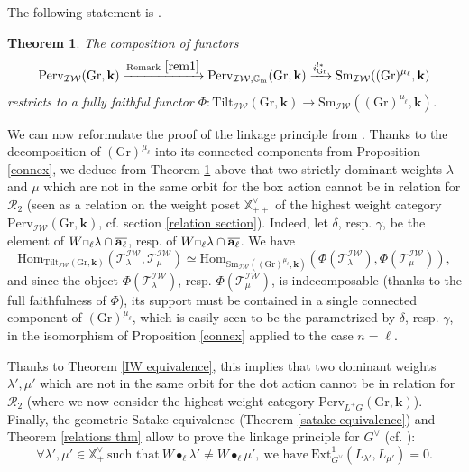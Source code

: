 \documentclass[11pt]{amsart}
\theoremstyle{plain}
\newtheorem{thm}{Theorem}[section]
\theoremstyle{remark}
\newcommand{\car}{\mbox{\relsize{-5}$\Box$}}
\numberwithin{equation}{section}
\begin{document}
	The following statement is \cite[Theorem 7.4]{riche2020smithtreumann}.
	\begin{thm}\label{equivalence1}
		The composition of functors
		$$\mathrm{Perv}_{\mathcal{IW}}(\mathrm{Gr},\mathbf{k})\xrightarrow{\text{Remark}~ \ref{rem1}}\mathrm{Perv}_{\mathcal{IW},\mathbb{G}_\mathrm{m}}(\mathrm{Gr},\mathbf{k})\xrightarrow{i^{!*}_{\mathrm{Gr}}}\mathrm{Sm}_{\mathcal{IW}}((\mathrm{Gr})^{\mu_\ell},\mathbf{k})$$
		restricts to a fully faithful functor $\Phi:\mathrm{Tilt}_{\mathcal{IW}}(\mathrm{Gr},\mathbf{k})\to \mathrm{Sm}_{\mathcal{IW}}((\mathrm{Gr})^{\mu_\ell},\mathbf{k})$.
	\end{thm}
	

	We can now reformulate the proof of the linkage principle from \cite[Theorem 8.5]{riche2020smithtreumann}. Thanks to the decomposition of $(\mathrm{Gr})^{\mu_\ell}$ into its connected components from Proposition \ref{connex}, we deduce from Theorem \ref{equivalence1} above that two strictly dominant weights $\lambda$ and $\mu$ which are not in the same orbit for the box action cannot be in relation for $\mathscr{R}_2$ (seen as a relation on the weight poset $\mathbb{X}^\vee_{++}$ of the highest weight category $\mathrm{Perv}_{\mathcal{IW}}(\mathrm{Gr},\mathbf{k})$, cf. section \ref{relation section}). Indeed, let $\delta$, resp. $\gamma$, be the element of $W\car_\ell\lambda\cap\overline{\mathbf{a}_\ell}$, resp. of $W\car_\ell\lambda\cap\overline{\mathbf{a}_\ell}$. We have
	$$\mathrm{Hom}_{\mathrm{Tilt}_{\mathcal{IW}}(\mathrm{Gr},\mathbf{k})}(\mathscr{T}_\lambda^{\mathcal{IW}},\mathscr{T}_\mu^{\mathcal{IW}})\simeq \mathrm{Hom}_{\mathrm{Sm}_{\mathcal{IW}}((\mathrm{Gr})^{\mu_\ell},\mathbf{k})}(\Phi(\mathscr{T}_\lambda^{\mathcal{IW}}),\Phi(\mathscr{T}_\mu^{\mathcal{IW}})),$$
	and since the object $\Phi(\mathscr{T}_\lambda^{\mathcal{IW}})$, resp. $\Phi(\mathscr{T}_\mu^{\mathcal{IW}})$, is indecomposable (thanks to the full faithfulness of $\Phi$), its support must be contained in a single connected component of $(\mathrm{Gr})^{\mu_\ell}$, which is easily seen to be the parametrized by $\delta$, resp.  $\gamma$, in the isomorphism of Proposition \ref{connex} applied to the case $n=\ell$.
	
	Thanks to Theorem \ref{IW equivalence}, this implies that two dominant weights $\lambda',\mu'$ which are not in the same orbit for the dot action cannot be in relation for $\mathscr{R}_2$ (where we now consider the highest weight category $\mathrm{Perv}_{L^+G}(\mathrm{Gr},\mathbf{k})$). Finally, the geometric Satake equivalence (Theorem \ref{satake equivalence}) and Theorem \ref{relations thm} allow to prove the linkage principle for $G^\vee$ (cf. \cite[Corollary 6.17, Part II]{jantzen2003representations}):
	\begin{equation}\label{linkage principle}
		\forall \lambda',\mu'\in \mathbb{X}^\vee_{+}~\text{such that}~W\bullet_{\ell}\lambda'\neq W\bullet_{\ell}\mu',~\text{we have}~\mathrm{Ext}_{G^\vee}^1(L_{\lambda'},L_{\mu'})=0. 
	\end{equation} 
	
\end{document}
